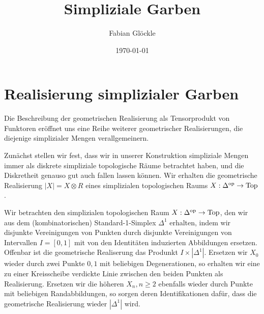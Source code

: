 



\title{Simpliziale Garben}
\author{Fabian Glöckle}
\date{\today}

\section{Realisierung simplizialer Garben}

Die Beschreibung der geometrischen Realisierung als Tensorprodukt von
Funktoren eröffnet uns eine Reihe weiterer geometrischer
Realisierungen, die diejenige simplizialer Mengen verallgemeinern.

Zunächst stellen wir fest, dass wir in unserer Konstruktion
simpliziale Mengen immer als diskrete simpliziale topologische Räume
betrachtet haben, und die Diskretheit genauso gut auch fallen lassen
können. Wir erhalten die geometrische Realisierung $|X| = X \otimes R$
eines simplizialen topologischen Raums $X: \Delta^\mathrm{op} \to \operatorname{Top}$.
\begin{bsp}
  Wir betrachten den simplizialen topologischen Raum $X: \Delta^\mathrm{op} \to
  \operatorname{Top}$, den wir aus dem (kombinatorischen) Standard-1-Simplex
  $\Delta^1$ erhalten, indem wir disjunkte Vereinigungen von Punkten
  durch disjunkte Vereinigungen von Intervallen $I = [0, 1]$ mit von
  den Identitäten induzierten Abbildungen ersetzen. Offenbar ist die
  geometrische Realiserung das Produnkt $I \times
  |\Delta^1|$. Ersetzen wir $X_0$ wieder durch zwei Punkte ${0, 1}$
  mit beliebigen Degenerationen, so erhalten wir eine zu einer
  Kreisscheibe verdickte Linie zwischen den beiden Punkten als
  Realisierung. Ersetzen wir die höheren $X_n, n \geq 2$ ebenfalls
  wieder durch Punkte mit beliebigen Randabbildungen, so sorgen deren
  Identifikationen dafür, dass die geometrische Realisierung wieder
  $|\Delta^1|$ wird.
\end{bsp}

